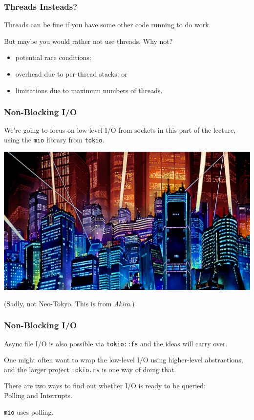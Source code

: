 \begin{frame}
\frametitle{Threads Insteads?}

Threads can be fine if you have some other code running to do work.


But maybe you would rather not use threads. Why not?

\begin{itemize}
\item potential race conditions;
\item overhead due to per-thread stacks; or
\item limitations due to maximum numbers of threads.
\end{itemize}

\end{frame}


\begin{frame}
\frametitle{Non-Blocking I/O}

We're going to focus on low-level I/O from sockets in this part of the lecture,
using the \texttt{mio} library from \texttt{tokio}. 

\begin{center}
	\includegraphics[width=\textwidth]{images/neotokyo.jpg}
\end{center}

(Sadly, not Neo-Tokyo. This is from \textit{Akira}.)

\end{frame}

\begin{frame}
\frametitle{Non-Blocking I/O}




Async file I/O is
also possible via \texttt{tokio::fs} and the ideas will carry over.


One might often want to wrap the low-level I/O using higher-level
abstractions, and the larger project \texttt{tokio.rs} is one way of
doing that.


There are two ways to find out whether I/O is ready to be queried:\\
\quad Polling and Interrupts.

\texttt{mio} uses polling.

\end{frame}


